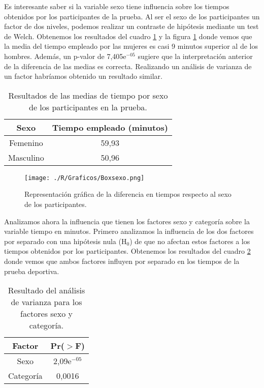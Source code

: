 \documentclass[11pt,a4paper]{article}
\begin{document}
Es interesante saber si la variable sexo tiene influencia sobre los tiempos obtenidos por los participantes de la prueba. Al ser el sexo de los participantes un factor de dos niveles, podemos realizar un contraste de hipótesis mediante un test de Welch. Obtenemos los resultados del cuadro \ref{tab:sexo} y la figura \ref{fig:boxsexo} donde vemos que la media del tiempo empleado por las mujeres es casi 9 minutos superior al de los hombres. Además, un p-valor de 7,405e$^{-05}$ sugiere que la interpretación anterior de la diferencia de las medias es correcta. Realizando un análisis de varianza de un factor habríamos obtenido un resultado similar.

\begin{table}[ht]
\centering
\begin{tabular}{cc}
\toprule[0.4mm]
Sexo & Tiempo empleado (minutos)\\
\midrule
Femenino & 59,93\\
Masculino & 50,96\\
\bottomrule[0.4mm]
\end{tabular}
\caption{Resultados de las medias de tiempo por sexo de los participantes en la prueba.}
\label{tab:sexo}
\end{table}

\begin{figure}
\centering
\texttt{[image: ./R/Graficos/Boxsexo.png]}
\caption{Representación gráfica de la diferencia en tiempos respecto al sexo de los participantes.}
\label{fig:boxsexo}
\end{figure}

Analizamos ahora la influencia que tienen los factores sexo y categoría sobre la variable tiempo en minutos. Primero analizamos la influencia de los dos factores por separado con una hipótesis nula (H$_{0}$) de que no afectan estos factores a los tiempos obtenidos por los participantes. Obtenemos los resultados del cuadro \ref{tab:anova1} donde vemos que ambos factores influyen por separado en los tiempos de la prueba deportiva.

\begin{table}[ht]
\centering
\begin{tabular}{cc}
\toprule[0.4mm]
Factor & Pr($>$F)\\
\midrule
Sexo & 2,09e$^{-05}$\\
Categoría & 0,0016\\
\bottomrule[0.4mm]
\end{tabular}
\caption{Resultado del análisis de varianza para los factores sexo y categoría.}
\label{tab:anova1}
\end{table}
\end{document}
